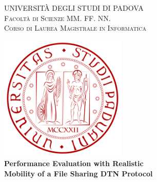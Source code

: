 
\begin{titlepage}
    \begin{center}
        {\Large UNIVERSITÀ DEGLI STUDI DI PADOVA}\\
        \vspace{0.2cm}                                                  %
        {\Large \scshape Facoltà di Scienze MM. FF. NN.}\\
        \vspace{2mm}
        {\Large \scshape Corso di Laurea Magistrale in Informatica}\\
        
        \vspace{2cm}
        
        \includegraphics[width=6cm]{figure/unipd_logo}\\
        
        
        \vspace{2cm}
        {\LARGE \bfseries Performance Evaluation with Realistic} \\
        \vspace{0.4cm}
        {\LARGE \bfseries Mobility of a File Sharing DTN Protocol} \\
        \vspace{2.3cm}
    \end{center}


\end{titlepage}
